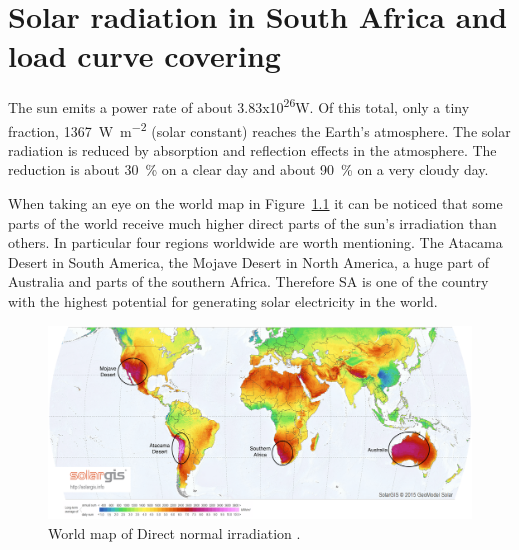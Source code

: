 \chapter{Solar radiation in South Africa and load curve covering}\label{Solar power in South Africa}

The sun emits a power rate of about 3.83x10\textsuperscript{26}W. Of this total, only a tiny fraction, \SI{1367}{\watt\per\square\metre} (solar constant) reaches the Earth’s atmosphere. The solar radiation is reduced by absorption and reflection effects in the atmosphere.  The reduction is about \SI{30}{\percent} on a clear day and about \SI{90}{\percent} on a very cloudy day. \cite{Stine2001a}

When taking an eye on the world map in Figure~\ref{WorldDNI} it can be noticed that some parts of the world receive much higher direct parts of the sun’s irradiation than others. In particular four regions worldwide are worth mentioning. The Atacama Desert in South America, the Mojave Desert in North America, a huge part of Australia and parts of the southern Africa. Therefore SA is one of the country with the highest potential for generating solar electricity in the world.

\begin{figure}[h!] 
\centering
\includegraphics[width=1\linewidth]{FIG/WorldDNI}
\caption[World map of Direct normal irradiation.]{World map of Direct normal irradiation \cite{SolarGIS2015c}.}\label{WorldDNI}
\end{figure}  

